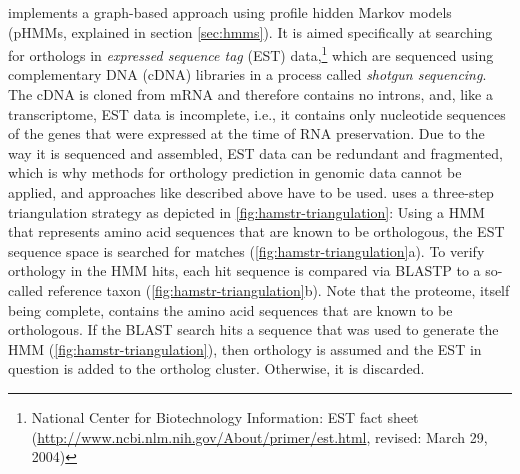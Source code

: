 \hamstr implements a graph-based approach using profile hidden Markov models
(pHMMs, explained in section \ref{sec:hmms}). It is aimed specifically at
searching for orthologs in \emph{expressed sequence tag} (EST)
data,\footnote{National Center for Biotechnology Information: EST fact sheet
(\url{http://www.ncbi.nlm.nih.gov/About/primer/est.html}, revised: March 29,
2004)} which are sequenced using complementary DNA (cDNA) libraries in a process
called \emph{shotgun sequencing}. The cDNA is cloned from mRNA and therefore
contains no introns, and, like a transcriptome, EST data is incomplete, i.e., it
contains only nucleotide sequences of the genes that were expressed at the time
of RNA preservation. Due to the way it is sequenced and assembled, EST data can
be redundant and fragmented, which is why methods for orthology prediction in
genomic data cannot be applied, and approaches like described above have to be
used. \hamstr uses a three-step triangulation strategy as depicted in
\autoref{fig:hamstr-triangulation}: Using a HMM that represents amino acid
sequences that are known to be orthologous, the EST sequence space is
searched for matches (\autoref{fig:hamstr-triangulation}a). To verify orthology
in the HMM hits, each hit sequence is compared via BLASTP \citep{altschul1997}
to a so-called reference taxon (\autoref{fig:hamstr-triangulation}b). Note that
the proteome, itself being complete, contains the amino acid sequences that are
known to be orthologous. If the BLAST search hits a sequence that was used to
generate the HMM (\autoref{fig:hamstr-triangulation}), then orthology is assumed
and the EST in question is added to the ortholog cluster. Otherwise, it is
discarded.



%
